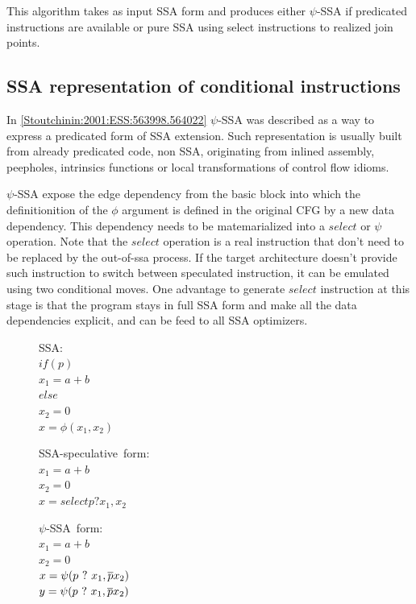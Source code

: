This algorithm takes as input SSA form and produces either $\psi$-SSA if predicated instructions are available or pure SSA using select instructions to realized join points.

\subsection{SSA representation of conditional instructions}

In \ref{Stoutchinin:2001:ESS:563998.564022} $\psi$-SSA was described as a way to express a predicated form of SSA extension. Such representation is usually built from already predicated code, non SSA, originating from inlined assembly, peepholes, intrinsics functions or local transformations of control flow idioms. 

$\psi$-SSA expose the edge dependency from the basic block into which the definitionition of the $\phi$ argument is defined in the original CFG by a new data dependency. This dependency needs to be matemarialized into a $select$ or $\psi$ operation. Note that the $select$ operation is a real instruction that don't need to be replaced by the out-of-ssa process. If the target architecture doesn't provide such instruction to switch between speculated instruction, it can be emulated using two conditional moves. One advantage to generate $select$ instruction at this stage is that the program stays in full SSA form and make all the data dependencies explicit, and can be feed to all SSA optimizers. 

\begin{figure}
\begin{minipage}[t]{4cm}
\mbox{SSA:} \\
$ if (p) $ \\
$   x_1 = a+b $ \\
$ else $ \\
$   x_2 = 0 $ \\
$ x = \phi (x_1, x_2) $ \\
\end{minipage}
\begin{minipage}[t]{4cm}
\mbox{SSA-speculative form:} \\
$x_1 = a + b $ \\
$x_2 = 0 $ \\
$x = select p ? x_1, x_2$ \\
\end{minipage}
\begin{minipage}[t]{4cm}
\mbox{$\psi$-SSA form:} \\
$x_1 = a + b $ \\
$x_2 = 0 $\\
$x = \psi (p ~?~ x_1, \overline{p} x_2) $ \\
$y = \psi (p ~?~ x_1, \overline{p} x_2) $ \\
\end{minipage}
\end{figure}


